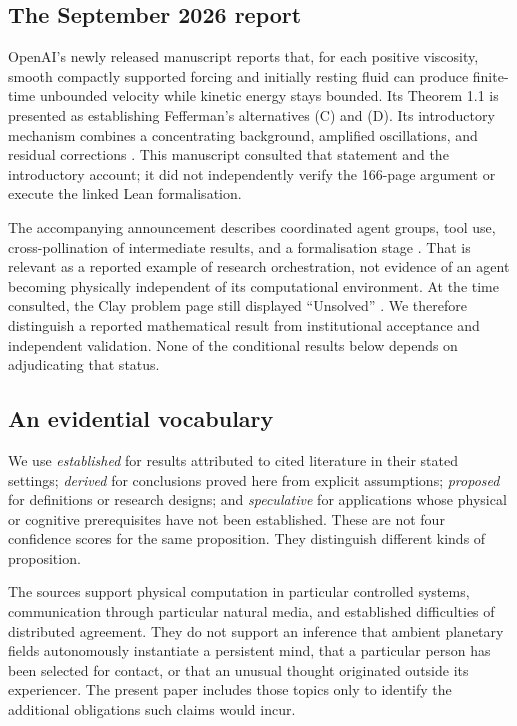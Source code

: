 \documentclass[11pt,a4paper]{article}
\theoremstyle{definition}
\theoremstyle{remark}
\begin{document}
\subsection{The September 2026 report}
OpenAI's newly released manuscript reports that, for each positive viscosity, smooth compactly supported forcing and initially resting fluid can produce finite-time unbounded velocity while kinetic energy stays bounded. Its Theorem 1.1 is presented as establishing Fefferman's alternatives (C) and (D). Its introductory mechanism combines a concentrating background, amplified oscillations, and residual corrections \citep{openains}. This manuscript consulted that statement and the introductory account; it did not independently verify the 166-page argument or execute the linked Lean formalisation.

The accompanying announcement describes coordinated agent groups, tool use, cross-pollination of intermediate results, and a formalisation stage \citep{openaiannounce}. That is relevant as a reported example of research orchestration, not evidence of an agent becoming physically independent of its computational environment. At the time consulted, the Clay problem page still displayed ``Unsolved'' \citep{claystatus}. We therefore distinguish a reported mathematical result from institutional acceptance and independent validation. None of the conditional results below depends on adjudicating that status.

\subsection{An evidential vocabulary}
We use \emph{established} for results attributed to cited literature in their stated settings; \emph{derived} for conclusions proved here from explicit assumptions; \emph{proposed} for definitions or research designs; and \emph{speculative} for applications whose physical or cognitive prerequisites have not been established. These are not four confidence scores for the same proposition. They distinguish different kinds of proposition.

The sources support physical computation in particular controlled systems, communication through particular natural media, and established difficulties of distributed agreement. They do not support an inference that ambient planetary fields autonomously instantiate a persistent mind, that a particular person has been selected for contact, or that an unusual thought originated outside its experiencer. The present paper includes those topics only to identify the additional obligations such claims would incur.
\end{document}
